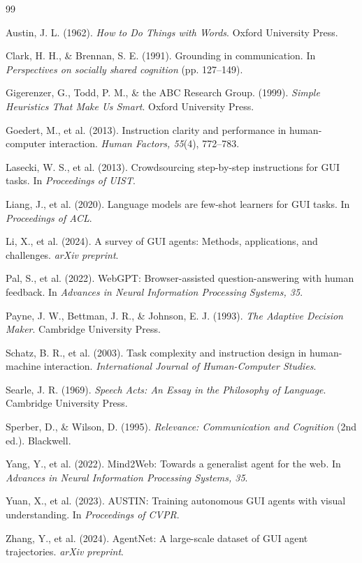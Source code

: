 \documentclass[12pt,a4paper,openany,oneside]{ctexrep}
\begin{document}
\begin{thebibliography}{99}


 Austin, J. L. (1962). \emph{How to Do Things with Words}. Oxford University Press.

 Clark, H. H., \& Brennan, S. E. (1991). Grounding in communication. In \emph{Perspectives on socially shared cognition} (pp. 127–149).

 Gigerenzer, G., Todd, P. M., \& the ABC Research Group. (1999). \emph{Simple Heuristics That Make Us Smart}. Oxford University Press.

 Goedert, M., et al. (2013). Instruction clarity and performance in human-computer interaction. \emph{Human Factors, 55}(4), 772–783.

 Lasecki, W. S., et al. (2013). Crowdsourcing step-by-step instructions for GUI tasks. In \emph{Proceedings of UIST}.

 Liang, J., et al. (2020). Language models are few-shot learners for GUI tasks. In \emph{Proceedings of ACL}.

 Li, X., et al. (2024). A survey of GUI agents: Methods, applications, and challenges. \emph{arXiv preprint}.

 Pal, S., et al. (2022). WebGPT: Browser-assisted question-answering with human feedback. In \emph{Advances in Neural Information Processing Systems, 35}.

 Payne, J. W., Bettman, J. R., \& Johnson, E. J. (1993). \emph{The Adaptive Decision Maker}. Cambridge University Press.

 Schatz, B. R., et al. (2003). Task complexity and instruction design in human-machine interaction. \emph{International Journal of Human-Computer Studies}.

 Searle, J. R. (1969). \emph{Speech Acts: An Essay in the Philosophy of Language}. Cambridge University Press.

 Sperber, D., \& Wilson, D. (1995). \emph{Relevance: Communication and Cognition} (2nd ed.). Blackwell.

 Yang, Y., et al. (2022). Mind2Web: Towards a generalist agent for the web. In \emph{Advances in Neural Information Processing Systems, 35}.

 Yuan, X., et al. (2023). AUSTIN: Training autonomous GUI agents with visual understanding. In \emph{Proceedings of CVPR}.

 Zhang, Y., et al. (2024). AgentNet: A large-scale dataset of GUI agent trajectories. \emph{arXiv preprint}.


\end{thebibliography}
\end{document}
